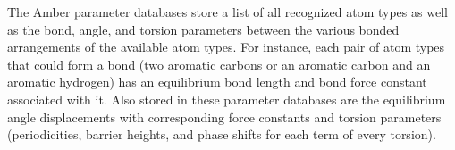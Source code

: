 The Amber parameter databases store a list of all recognized atom types as well
as the bond, angle, and torsion parameters between the various bonded
arrangements of the available atom types. For instance, each pair of atom types
that could form a bond (\eg two aromatic carbons or an aromatic carbon and an
aromatic hydrogen) has an equilibrium bond length and bond force constant
associated with it. Also stored in these parameter databases are the equilibrium
angle displacements with corresponding force constants and torsion parameters
(periodicities, barrier heights, and phase shifts for each term of every
torsion).
